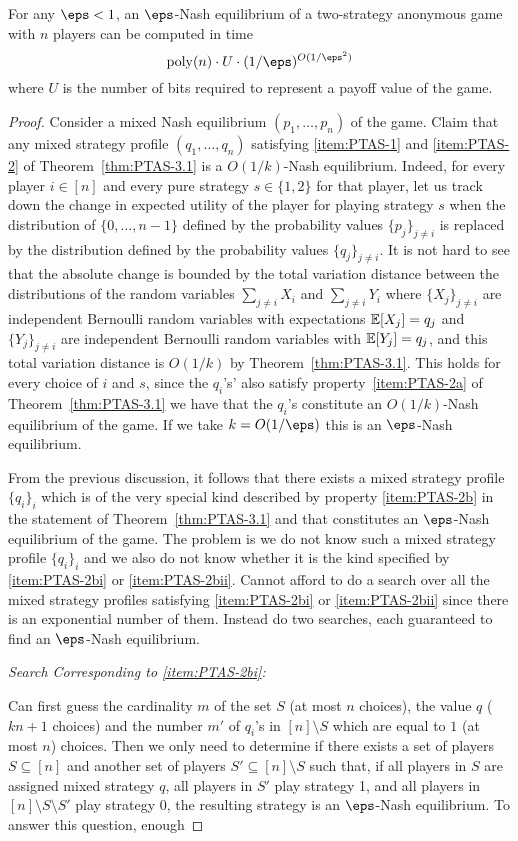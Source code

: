 \begin{theorem}
	\label{thm:PTAS-3.2}
	For any $\eps < 1$, an $\eps$-Nash equilibrium of a two-strategy anonymous game with $n$ players can be computed in time 
	\[\poly(n)\cdot U \cdot (1/\eps)^{O(1/\eps^2)}\]
	where $U$ is the number of bits required to represent a payoff value of the game.
\end{theorem}
\begin{proof}
	Consider a mixed Nash equilibrium $(p_1, \dots, p_n)$ of the game. Claim that any mixed strategy profile $(q_1, \dots, q_n)$ satisfying \ref{item:PTAS-1} and \ref{item:PTAS-2} of Theorem~\ref{thm:PTAS-3.1} is a $O(1/k)$-Nash equilibrium. Indeed, for every player $i \in [n]$ and every pure strategy $s\in\{1,2\}$ for that player, let us track down the change in expected utility of the player for playing strategy $s$ when the distribution of $\{0,\dots, n-1\}$ defined by the probability values $\{p_j\}_{j\neq i}$ is replaced by the distribution defined by the probability values $\{q_j\}_{j\neq i}$. It is not hard to see that the absolute change is bounded by the total variation distance between the distributions of the random variables $\sum_{j\neq i} X_i$ and $\sum_{j\neq i}Y_i$ where $\{X_j\}_{j\neq i}$ are independent Bernoulli random variables with expectations $\mathbb{E}[X_j] = q_j$ and $\{Y_j\}_{j\neq i}$ are independent Bernoulli random variables with $\mathbb{E}[Y_j] = q_j$, and this total variation distance is $O(1/k)$ by Theorem~\ref{thm:PTAS-3.1}. This holds for every choice of $i$ and $s$, since the $q_i$'s' also satisfy property~\ref{item:PTAS-2a} of Theorem~\ref{thm:PTAS-3.1} we have that the $q_i$'s constitute an $O(1/k)$-Nash equilibrium of the game. If we take $k = O(1/\eps)$ this is an $\eps$-Nash equilibrium.

	From the previous discussion, it follows that there exists a mixed strategy profile $\{q_i\}_i$ which is of the very special kind described by property \ref{item:PTAS-2b} in the statement of Theorem~\ref{thm:PTAS-3.1} and that constitutes an $\eps$-Nash equilibrium of the game. The problem is we do not know such a mixed strategy profile $\{q_i\}_i$ and we also do not know whether it is the kind specified by \ref{item:PTAS-2bi} or \ref{item:PTAS-2bii}. Cannot afford to do a search over all the mixed strategy profiles satisfying \ref{item:PTAS-2bi} or \ref{item:PTAS-2bii} since there is an exponential number of them. Instead do two searches, each guaranteed to find an $\eps$-Nash equilibrium.

	\emph{Search Corresponding to \ref{item:PTAS-2bi}:}

	Can first guess the cardinality $m$ of the set $S$ (at most $n$ choices), the value $q$ ($kn + 1$ choices) and the number $m'$ of $q_i$'s in $[n]\setminus S$ which are equal to $1$ (at most $n$) choices. Then we only need to determine if there exists a set of players $S \subseteq [n]$ and another set of players $S' \subseteq [n]\setminus S$ such that, if all players in $S$ are assigned mixed strategy $q$, all players in $S'$ play strategy 1, and all players in $[n]\setminus S \setminus S'$ play strategy 0, the resulting strategy is an $\eps$-Nash equilibrium. To answer this question, enough 
\end{proof}

 